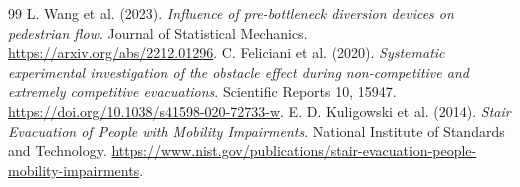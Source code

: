 \documentclass[11pt,a4paper]{article}
\begin{document}
\begin{thebibliography}{99}
 L. Wang et al. (2023). \emph{Influence of pre-bottleneck diversion devices on pedestrian flow}. Journal of Statistical Mechanics. \url{https://arxiv.org/abs/2212.01296}.
 C. Feliciani et al. (2020). \emph{Systematic experimental investigation of the obstacle effect during non-competitive and extremely competitive evacuations}. Scientific Reports 10, 15947. \url{https://doi.org/10.1038/s41598-020-72733-w}.
 E. D. Kuligowski et al. (2014). \emph{Stair Evacuation of People with Mobility Impairments}. National Institute of Standards and Technology. \url{https://www.nist.gov/publications/stair-evacuation-people-mobility-impairments}.
\end{thebibliography}
\end{document}

